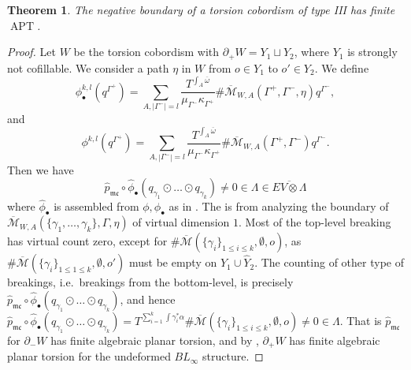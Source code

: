 \documentclass[11pt]{amsart}
\numberwithin{equation}{section}
\newtheorem{theorem}{\textbf{Theorem}}[section]
\def\cM{{\mathcal M}}
\def\mc{{\mathfrak {mc}}}
\DeclareMathOperator{\APT}{APT}
\begin{document}
\begin{theorem}\label{thm:torsion_III}\label{thm:APT_III}
    The negative boundary of a torsion cobordism of type III has finite $\APT$.
\end{theorem}
\begin{proof}
    Let $W$ be the torsion cobordism with $\partial_+W=Y_1\sqcup Y_2$, where $Y_1$ is strongly not cofillable. We consider a path $\eta$ in $W$ from $o\in Y_1$ to $o'\in Y_2$. We define 
    $$\phi^{k,l}_{\bullet}(q^{\Gamma^+})=\sum_{A,|\Gamma^-|=l} \frac{T^{\int_A\overline{\omega}}}{\mu_{\Gamma^-}\kappa_{\Gamma^+}}\#\overline{\cM}_{W,A}(\Gamma^+,\Gamma^-,\eta)q^{\Gamma^-},$$
    and 
    $$\phi^{k,l}(q^{\Gamma^+})=\sum_{A,|\Gamma^-|=l} \frac{T^{\int_A\overline{\omega}}}{\mu_{\Gamma^-}\kappa_{\Gamma^+}}\#\overline{\cM}_{W,A}(\Gamma^+,\Gamma^-)q^{\Gamma^-}.$$
    Then we have 
    $$\widehat{p}_{\mc}\circ \widehat{\phi}_{\bullet}(q_{\gamma_1}\odot\ldots \odot q_{\gamma_k})\ne 0 \in \Lambda \in \overline{EV\otimes \Lambda}$$
    where $\widehat{\phi}_{\bullet}$ is assembled from $\phi,\phi_{\bullet}$ as in \cite[before Definition 2.22]{moreno2024landscape}. The is from analyzing the boundary of $\overline{\cM}_{W,A}(\{\gamma_1,\ldots,\gamma_k\},\Gamma,\eta)$ of virtual dimension $1$. Most of the top-level breaking has virtual count zero, except for $\#\overline{\cM}(\{\gamma_i\}_{1\le i \le k},\emptyset,o)$, as $\#\overline{\cM}(\{\gamma_i\}_{1\le 1\le k},\emptyset,o')$ must be empty on $\widehat{Y}_1\cup \widehat{Y}_2$. The counting of other type of breakings, i.e.\ breakings from the bottom-level, is precisely $\widehat{p}_{\mc}\circ \widehat{\phi}_{\bullet}(q_{\gamma_1}\odot\ldots \odot q_{\gamma_k})$, and hence $\widehat{p}_{\mc}\circ \widehat{\phi}_{\bullet}(q_{\gamma_1}\odot\ldots \odot q_{\gamma_k})=T^{\sum_{i=1}^k \int \gamma_i^*\alpha}\#\overline{\cM}(\{\gamma_i\}_{1\le i \le k},\emptyset,o)\ne 0 \in \Lambda$. That is $\widehat{p}_{\mc}$ for $\partial_-W$ has finite algebraic planar torsion, and by \cite[Proof of theorem 1.1]{moreno2024rsft}, $\partial_+W$ has finite algebraic planar torsion for the undeformed $BL_\infty$ structure. 
\end{proof}
\end{document}
